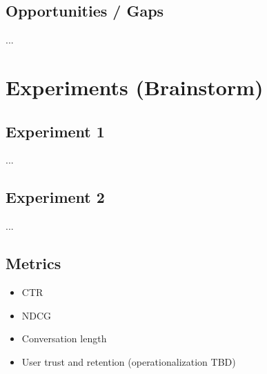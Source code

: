 \documentclass{article}
\begin{document}
\subsection{Opportunities / Gaps}
...

\newpage 


\section{Experiments (Brainstorm)}

\subsection{Experiment 1}
...

\subsection{Experiment 2}
...

\subsection{Metrics}
\begin{itemize}
    \item CTR
    \item NDCG
    \item Conversation length
    \item User trust and retention (operationalization TBD)
\end{itemize}

\newpage 

\end{document}
